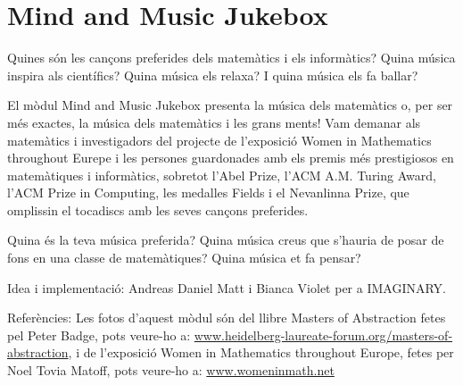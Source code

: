 \section{Mind and Music Jukebox}
Quines són les cançons preferides dels matemàtics i els informàtics? Quina música inspira als científics? Quina música els relaxa? I quina música els fa ballar?

El mòdul Mind and Music Jukebox presenta la música dels matemàtics o, per ser més exactes, la música dels matemàtics i les grans ments! Vam demanar als matemàtics i investigadors del projecte de l'exposició Women in Mathematics throughout Eurepe i les persones guardonades amb els premis més prestigiosos en matemàtiques i informàtics, sobretot l'Abel Prize, l'ACM A.M. Turing Award, l'ACM Prize in Computing, les medalles Fields i el Nevanlinna Prize, que omplissin el tocadiscs amb les seves cançons preferides.

Quina és la teva música preferida? Quina música creus que s'hauria de posar de fons en una classe de matemàtiques? Quina música et fa pensar?

\vfill
Idea i implementació: Andreas Daniel Matt i Bianca Violet per a IMAGINARY.

Referències:
Les fotos d'aquest mòdul són del llibre Masters of Abstraction fetes pel Peter Badge, pots veure-ho a: \url{www.heidelberg-laureate-forum.org/masters-of-abstraction}, i de l'exposició Women in Mathematics throughout Europe, fetes per Noel Tovia Matoff, pots veure-ho a: \url{www.womeninmath.net}


